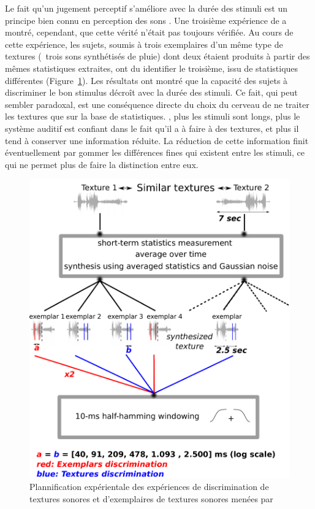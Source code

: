 {{Le fait qu'un jugement perceptif s'améliore avec la durée des stimuli est un principe bien connu en perception des sons \citep{moore1973frequency}. Une troisième expérience de \citep{mcdermott2013summary} a montré, cependant, que cette vérité n'était pas toujours vérifiée. Au cours de cette expérience, les sujets, soumis à trois exemplaires d'un même type de textures (\eg~trois sons synthétisés de pluie) dont deux étaient produits à partir des mêmes statistiques extraites, ont du identifier le troisième, issu de statistiques différentes (Figure~\ref{fig:textureMcder}). Les résultats ont montré que la capacité des sujets à discriminer le bon stimulus décroît avec la durée des stimuli. Ce fait, qui peut sembler paradoxal, est une conséquence directe du choix du cerveau de ne traiter les textures que sur la base de statistiques.  , plus les stimuli sont longs, plus le système auditif est confiant dans le fait qu'il a à faire à des textures, et plus il tend à conserver une information réduite. La réduction de cette information finit éventuellement par gommer les différences fines qui existent entre les stimuli, ce qui ne permet plus de faire la distinction entre eux.


\begin{figure}[t]
        \myfloatalign
        \includegraphics[width=.8\linewidth]{gfx/ch_3/mcder}
        \caption[Plannification expérimentale de l'expérience de discrimination de textures sonores et d'exemplaires de textures sonores]{Plannification expérientale des expériences de discrimination de textures sonores et d'exemplaires de textures sonores menées par \citep{mcdermott2013summary}}\label{fig:textureMcder}
\end{figure}

}}
